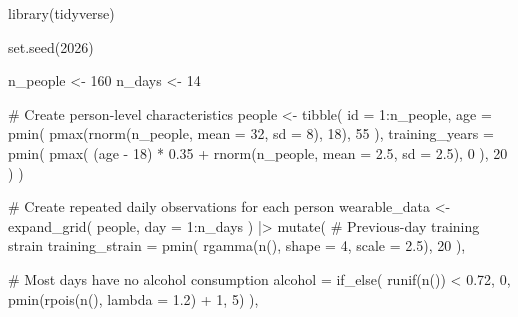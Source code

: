 \documentclass[
  letterpaper,
  DIV=11,
  numbers=noendperiod]{scrreprt}
\newenvironment{Shaded}{\begin{snugshade}}{\end{snugshade}}
\newcommand{\AttributeTok}[1]{\textcolor[rgb]{0.40,0.45,0.13}{#1}}
\newcommand{\CommentTok}[1]{\textcolor[rgb]{0.37,0.37,0.37}{#1}}
\newcommand{\DecValTok}[1]{\textcolor[rgb]{0.68,0.00,0.00}{#1}}
\newcommand{\FloatTok}[1]{\textcolor[rgb]{0.68,0.00,0.00}{#1}}
\newcommand{\FunctionTok}[1]{\textcolor[rgb]{0.28,0.35,0.67}{#1}}
\newcommand{\NormalTok}[1]{\textcolor[rgb]{0.00,0.23,0.31}{#1}}
\newcommand{\OtherTok}[1]{\textcolor[rgb]{0.00,0.23,0.31}{#1}}
\newcommand{\SpecialCharTok}[1]{\textcolor[rgb]{0.37,0.37,0.37}{#1}}
\begin{document}
\begin{Shaded}
\begin{Highlighting}[]
\FunctionTok{library}\NormalTok{(tidyverse)}

\FunctionTok{set.seed}\NormalTok{(}\DecValTok{2026}\NormalTok{)}

\NormalTok{n\_people }\OtherTok{\textless{}{-}} \DecValTok{160}
\NormalTok{n\_days }\OtherTok{\textless{}{-}} \DecValTok{14}

\CommentTok{\# Create person{-}level characteristics}
\NormalTok{people }\OtherTok{\textless{}{-}} \FunctionTok{tibble}\NormalTok{(}
  \AttributeTok{id =} \DecValTok{1}\SpecialCharTok{:}\NormalTok{n\_people,}
  \AttributeTok{age =} \FunctionTok{pmin}\NormalTok{(}
    \FunctionTok{pmax}\NormalTok{(}\FunctionTok{rnorm}\NormalTok{(n\_people, }\AttributeTok{mean =} \DecValTok{32}\NormalTok{, }\AttributeTok{sd =} \DecValTok{8}\NormalTok{), }\DecValTok{18}\NormalTok{),}
    \DecValTok{55}
\NormalTok{  ),}
  \AttributeTok{training\_years =} \FunctionTok{pmin}\NormalTok{(}
    \FunctionTok{pmax}\NormalTok{(}
\NormalTok{      (age }\SpecialCharTok{{-}} \DecValTok{18}\NormalTok{) }\SpecialCharTok{*} \FloatTok{0.35} \SpecialCharTok{+} \FunctionTok{rnorm}\NormalTok{(n\_people, }\AttributeTok{mean =} \FloatTok{2.5}\NormalTok{, }\AttributeTok{sd =} \FloatTok{2.5}\NormalTok{),}
      \DecValTok{0}
\NormalTok{    ),}
    \DecValTok{20}
\NormalTok{  )}
\NormalTok{)}

\CommentTok{\# Create repeated daily observations for each person}
\NormalTok{wearable\_data }\OtherTok{\textless{}{-}} \FunctionTok{expand\_grid}\NormalTok{(}
\NormalTok{  people,}
  \AttributeTok{day =} \DecValTok{1}\SpecialCharTok{:}\NormalTok{n\_days}
\NormalTok{) }\SpecialCharTok{|\textgreater{}}
  \FunctionTok{mutate}\NormalTok{(}
    \CommentTok{\# Previous{-}day training strain}
    \AttributeTok{training\_strain =} \FunctionTok{pmin}\NormalTok{(}
      \FunctionTok{rgamma}\NormalTok{(}\FunctionTok{n}\NormalTok{(), }\AttributeTok{shape =} \DecValTok{4}\NormalTok{, }\AttributeTok{scale =} \FloatTok{2.5}\NormalTok{),}
      \DecValTok{20}
\NormalTok{    ),}

    \CommentTok{\# Most days have no alcohol consumption}
    \AttributeTok{alcohol =} \FunctionTok{if\_else}\NormalTok{(}
      \FunctionTok{runif}\NormalTok{(}\FunctionTok{n}\NormalTok{()) }\SpecialCharTok{\textless{}} \FloatTok{0.72}\NormalTok{,}
      \DecValTok{0}\NormalTok{,}
      \FunctionTok{pmin}\NormalTok{(}\FunctionTok{rpois}\NormalTok{(}\FunctionTok{n}\NormalTok{(), }\AttributeTok{lambda =} \FloatTok{1.2}\NormalTok{) }\SpecialCharTok{+} \DecValTok{1}\NormalTok{, }\DecValTok{5}\NormalTok{)}
\NormalTok{    ),}


\end{Highlighting}
\end{Shaded}
\end{document}
